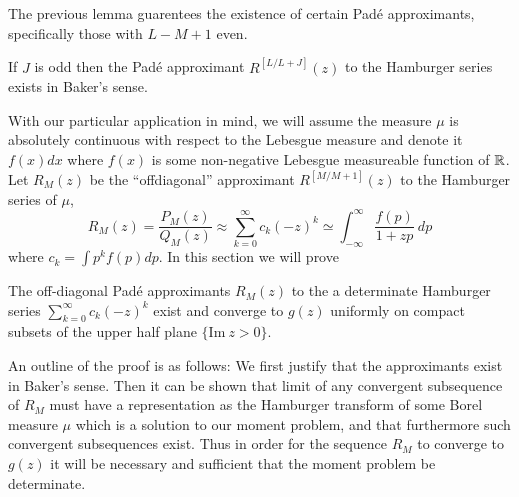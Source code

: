 The previous lemma guarentees the existence of certain Pad\'e approximants, specifically those with $L-M+1$ even. 
\begin{theorem}
  If $J$ is odd then the Pad\'e approximant $R^{[L/L+J]}(z)$ to the Hamburger series exists in Baker's sense.
\end{theorem}


With our particular application in mind, we will assume the measure $\mu$ is absolutely continuous with respect to the Lebesgue measure and denote it $f(x)dx$ where $f(x)$ is some non-negative Lebesgue measureable function of $\mathbb{R}$. Let $R_M(z)$ be the ``offdiagonal'' approximant $R^{[M/M+1]}(z)$ to the Hamburger series of $\mu$,
\[
  R_M(z) = \frac{P_M(z)}{Q_M(z)} \approx \sum_{k=0}^\infty c_k {(-z)}^k \simeq \int_{-\infty}^\infty \frac{f(p)}{1 + zp} ~dp
\]
where $c_k = \int p^k f(p) dp$. In this section we will prove

\begin{theorem}
  The off-diagonal Pad\'e approximants $R_M(z)$ to the a determinate Hamburger series $\sum_{k=0}^\infty c_k {(-z)}^k$ exist and converge to $g(z)$ uniformly on compact subsets of the upper half plane $\{\text{Im} ~z > 0\}$.
\end{theorem}

An outline of the proof is as follows: We first justify that the approximants exist in Baker's sense. Then it can be shown that limit of any convergent subsequence of $R_M$ must have a representation as the Hamburger transform of some Borel measure $\mu$ which is a solution to our moment problem, and that furthermore such convergent subsequences exist. Thus in order for the sequence $R_M$ to converge to $g(z)$ it will be necessary and sufficient that the moment problem be determinate.


